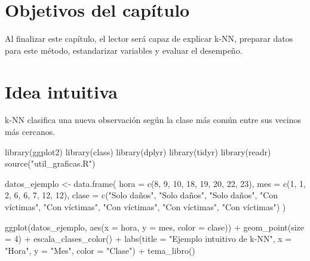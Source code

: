 \documentclass[
  spanish,
  11pt,
  letterpaper,
]{book}
\newenvironment{Shaded}{}{}
\newcommand{\AttributeTok}[1]{\textcolor[rgb]{0.84,0.23,0.29}{#1}}
\newcommand{\DecValTok}[1]{\textcolor[rgb]{0.00,0.36,0.77}{#1}}
\newcommand{\FunctionTok}[1]{\textcolor[rgb]{0.44,0.26,0.76}{#1}}
\newcommand{\NormalTok}[1]{\textcolor[rgb]{0.14,0.16,0.18}{#1}}
\newcommand{\OtherTok}[1]{\textcolor[rgb]{0.44,0.26,0.76}{#1}}
\newcommand{\SpecialCharTok}[1]{\textcolor[rgb]{0.00,0.36,0.77}{#1}}
\newcommand{\StringTok}[1]{\textcolor[rgb]{0.01,0.18,0.38}{#1}}
\begin{document}
\section{Objetivos del capítulo}\label{objetivos-del-capuxedtulo-4}

Al finalizar este capítulo, el lector será capaz de explicar k-NN,
preparar datos para este método, estandarizar variables y evaluar el
desempeño.

\section{Idea intuitiva}\label{idea-intuitiva}

k-NN clasifica una nueva observación según la clase más común entre sus
vecinos más cercanos.

\begin{Shaded}
\begin{Highlighting}[]
\FunctionTok{library}\NormalTok{(ggplot2)}
\FunctionTok{library}\NormalTok{(class)}
\FunctionTok{library}\NormalTok{(dplyr)}
\FunctionTok{library}\NormalTok{(tidyr)}
\FunctionTok{library}\NormalTok{(readr)}
\FunctionTok{source}\NormalTok{(}\StringTok{"util\_graficas.R"}\NormalTok{)}

\NormalTok{datos\_ejemplo }\OtherTok{\textless{}{-}} \FunctionTok{data.frame}\NormalTok{(}
  \AttributeTok{hora =} \FunctionTok{c}\NormalTok{(}\DecValTok{8}\NormalTok{, }\DecValTok{9}\NormalTok{, }\DecValTok{10}\NormalTok{, }\DecValTok{18}\NormalTok{, }\DecValTok{19}\NormalTok{, }\DecValTok{20}\NormalTok{, }\DecValTok{22}\NormalTok{, }\DecValTok{23}\NormalTok{),}
  \AttributeTok{mes =} \FunctionTok{c}\NormalTok{(}\DecValTok{1}\NormalTok{, }\DecValTok{1}\NormalTok{, }\DecValTok{2}\NormalTok{, }\DecValTok{6}\NormalTok{, }\DecValTok{6}\NormalTok{, }\DecValTok{7}\NormalTok{, }\DecValTok{12}\NormalTok{, }\DecValTok{12}\NormalTok{),}
  \AttributeTok{clase =} \FunctionTok{c}\NormalTok{(}\StringTok{"Solo daños"}\NormalTok{, }\StringTok{"Solo daños"}\NormalTok{, }\StringTok{"Solo daños"}\NormalTok{, }\StringTok{"Con víctimas"}\NormalTok{, }\StringTok{"Con víctimas"}\NormalTok{, }\StringTok{"Con víctimas"}\NormalTok{, }\StringTok{"Con víctimas"}\NormalTok{, }\StringTok{"Con víctimas"}\NormalTok{)}
\NormalTok{)}

\FunctionTok{ggplot}\NormalTok{(datos\_ejemplo, }\FunctionTok{aes}\NormalTok{(}\AttributeTok{x =}\NormalTok{ hora, }\AttributeTok{y =}\NormalTok{ mes, }\AttributeTok{color =}\NormalTok{ clase)) }\SpecialCharTok{+}
  \FunctionTok{geom\_point}\NormalTok{(}\AttributeTok{size =} \DecValTok{4}\NormalTok{) }\SpecialCharTok{+}
  \FunctionTok{escala\_clases\_color}\NormalTok{() }\SpecialCharTok{+}
  \FunctionTok{labs}\NormalTok{(}\AttributeTok{title =} \StringTok{"Ejemplo intuitivo de k{-}NN"}\NormalTok{, }\AttributeTok{x =} \StringTok{"Hora"}\NormalTok{, }\AttributeTok{y =} \StringTok{"Mes"}\NormalTok{, }\AttributeTok{color =} \StringTok{"Clase"}\NormalTok{) }\SpecialCharTok{+}
  \FunctionTok{tema\_libro}\NormalTok{()}
\end{Highlighting}
\end{Shaded}
\end{document}
